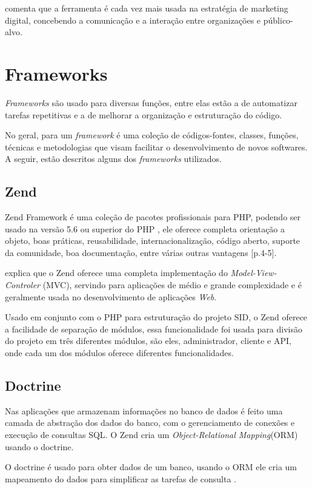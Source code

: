 \citet{sousa2014} comenta que a ferramenta é cada vez mais usada na estratégia de marketing digital, concebendo a comunicação e a interação entre organizações e público-alvo.

\section{Frameworks}
\textit{Frameworks} são usado para diversas funções, entre elas estão a de automatizar tarefas repetitivas e a de melhorar a organização e estruturação do código.  

No geral, para \citet{minetto2007} um \textit{framework} é uma coleção de códigos-fontes, classes, funções, técnicas e metodologias que visam facilitar o desenvolvimento de novos softwares. A seguir, estão descritos alguns dos \textit{frameworks} utilizados.

\subsection{Zend}
Zend Framework é uma coleção de pacotes profissionais para PHP, podendo ser usado na versão 5.6 ou superior do PHP \citet{zend2018}, ele oferece completa orientação a objeto, boas práticas, reusabilidade, internacionalização, código aberto, suporte da comunidade, boa documentação, entre várias outras vantagens \citet{vaswani2010}[p.4-5].

\citet[p.3]{vaswani2010} explica que o Zend oferece uma completa implementação do \textit{Model-View-Controler} (MVC), servindo para aplicações de médio e grande complexidade e é geralmente usada no desenvolvimento de aplicações \textit{Web}.

Usado em conjunto com o PHP para estruturação do projeto SID, o Zend oferece a facilidade de separação de módulos, essa funcionalidade foi usada para divisão do projeto em três diferentes módulos, são eles, administrador, cliente e API, onde cada um dos módulos oferece diferentes funcionalidades.

\subsection{Doctrine}
Nas aplicações que armazenam informações no banco de dados é feito uma camada de abstração dos dados do banco, com o gerenciamento de conexões e execução de consultas SQL. O Zend cria um \textit{Object-Relational Mapping}(ORM) usando o doctrine.

O doctrine é usado para obter dados de um banco, usando o ORM ele cria um mapeamento do dados para simplificar as tarefas de consulta \citet[p.102]{vaswani2010}.


